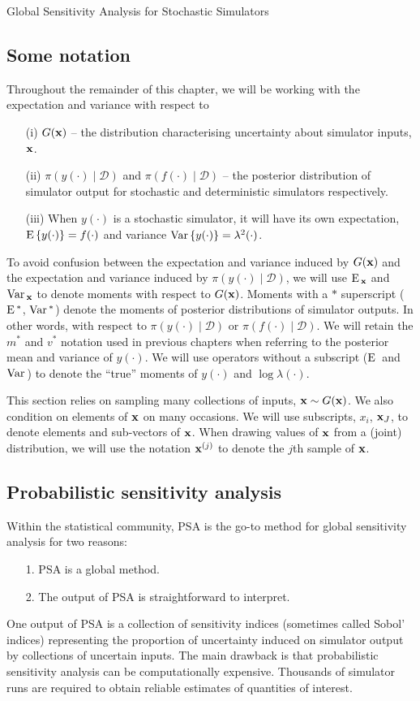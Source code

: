 \begin{chapter}{Global Sensitivity Analysis for Stochastic Simulators\label{Ch:sensitivity}}
\subsection{Some notation}
Throughout the remainder of this chapter, we will be working with the expectation and variance with respect to
\begin{itemize}
  \item[(i)]  $G(\mathbf{x})$ -- the distribution characterising uncertainty about simulator inputs, $\mathbf{x}$.
  \item[(ii)] $\pi(y(\cdot) \mid \mathcal{D})$ and $\pi(f(\cdot) \mid \mathcal{D})$ -- the posterior distribution of simulator output for stochastic and deterministic simulators respectively.
  \item[(iii)] When $y(\cdot)$ is a stochastic simulator, it will have its own expectation, $\textrm{E}\, \{ y(\cdot) \} = f(\cdot) $ and variance $\mathrm{Var}\, \{ y(\cdot) \} = \lambda^2(\cdot)$.
\end{itemize}
To avoid confusion between the expectation and variance induced by $G(\mathbf{x})$ and the expectation and variance induced by $\pi(y(\cdot) \mid \mathcal{D})$, we will use $\textrm{E}\,_{\mathbf{x}}$ and $\mathrm{Var}\,_{\mathbf{x}}$ to denote moments with respect to $G(\mathbf{x})$. Moments with a $*$ superscript ($\textrm{E}\,^{*}$, $\mathrm{Var}\,^{*}$) denote the moments of posterior distributions of simulator outputs. In other words, with respect to $\pi(y(\cdot) \mid \mathcal{D})$ or $\pi(f(\cdot) \mid \mathcal{D})$. We will retain the $m^{*}$  and $v^{*}$ notation used in previous chapters when referring to the posterior mean and variance of $y(\cdot)$. We will use operators without a subscript ($\textrm{E}\,$ and $\mathrm{Var}\,$) to denote the ``true'' moments of $y(\cdot)$ and $\log \lambda (\cdot)$.

This section relies on sampling many collections of inputs, $\mathbf{x} \sim G(\mathbf{x})$. We also condition on elements of $\mathbf{x}$ on many occasions. We will use subscripts, $x_i$, $\mathbf{x}_J$, to denote elements and sub-vectors of $\mathbf{x}$. When drawing values of $\mathbf{x}$ from a (joint) distribution, we will use the notation $\mathbf{x}^{(j)}$ to denote the $j$th sample of $\mathbf{x}$.

\subsection{Probabilistic sensitivity analysis}
Within the statistical community, PSA is the go-to method for global sensitivity analysis for two reasons:
\begin{itemize}
  \item[1.] PSA is a global method.
  \item[2.] The output of PSA is straightforward to interpret.
\end{itemize}
One output of PSA is a collection of sensitivity indices (sometimes called Sobol' indices) representing the proportion of uncertainty induced on simulator output by collections of uncertain inputs. The main drawback is that probabilistic sensitivity analysis can be computationally expensive. Thousands of simulator runs are required to obtain reliable estimates of quantities of interest.


\end{chapter}

